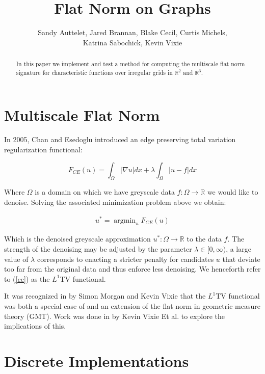 \documentclass[12pt]{article}
\title{Flat Norm on Graphs}
\author{Sandy Auttelet, Jared Brannan, Blake Cecil, Curtis Michels,\\
 Katrina Sabochick, Kevin Vixie }
\DeclareMathOperator*{\argmin}{argmin}
\begin{document}
\maketitle

\begin{abstract}
In this paper we implement and test a method for computing the multiscale flat norm signature for characteristic functions over irregular grids in $\mathbb{R}^2$ and $\mathbb{R}^3$.
\end{abstract}

\tableofcontents

\section{Multiscale Flat Norm}

In 2005, Chan and Esedoglu introduced an edge preserving total variation regularization functional:

\begin{equation} \label{ce}
F_{CE}(u) = \int_\Omega |\nabla u| dx + \lambda \int_{\Omega} |u-f|dx
\end{equation}

Where $\Omega$ is a domain on which we have greyscale data $f:\Omega \to \mathbb{R}$ we would like to denoise. Solving the associated minimization problem above we obtain:

\begin{align*}
u^* = \argmin_u F_{CE}(u)
\end{align*}

Which is the denoised greyscale approximation $u^*:\Omega \to \mathbb{R}$ to the data $f$. The strength of the denoising may be adjusted by the parameter $\lambda \in [0,\infty)$, a large value of $\lambda$ corresponds to enacting a stricter penalty for candidates $u$ that deviate too far from the original data and thus enforce less denoising. We henceforth refer to (\ref{ce}) as the $L^1$TV functional.

It was recognized in \cite{Morgan_2007} by Simon Morgan and Kevin Vixie that the $L^1$TV functional was both a special case of and an extension of the flat norm in geometric measure theory (GMT). Work was done in \cite{shapes} by Kevin Vixie Et al. to explore the implications of this.


\section{Discrete Implementations}
\end{document}
